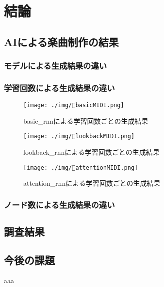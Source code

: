 \chapter{結論}
\section{AIによる楽曲制作の結果}
\subsection{モデルによる生成結果の違い}
\subsection{学習回数による生成結果の違い}
\begin{figure}[h]
    \begin{screen}
    \begin{center}
        \texttt{[image: ./img/basicMIDI.png]}
        \caption{basic\_rnnによる学習回数ごとの生成結果}
        \label{fig:basic_rnnによる学習回数ごとの生成結果}
    \end{center}
    \end{screen}
\end{figure}
\begin{figure}[h]
    \begin{screen}
    \begin{center}
        \texttt{[image: ./img/lookbackMIDI.png]}
        \caption{lookback\_rnnによる学習回数ごとの生成結果}
        \label{fig:lookback_rnnによる学習回数ごとの生成結果}
    \end{center}
    \end{screen}
\end{figure}
\begin{figure}[h]
    \begin{screen}
    \begin{center}
        \texttt{[image: ./img/attentionMIDI.png]}
        \caption{attention\_rnnによる学習回数ごとの生成結果}
        \label{fig:attention_rnnによる学習回数ごとの生成結果}
    \end{center}
    \end{screen}
\end{figure}
  
\subsection{ノード数による生成結果の違い}
\section{調査結果}

\newpage

\section{今後の課題}
aaa\\